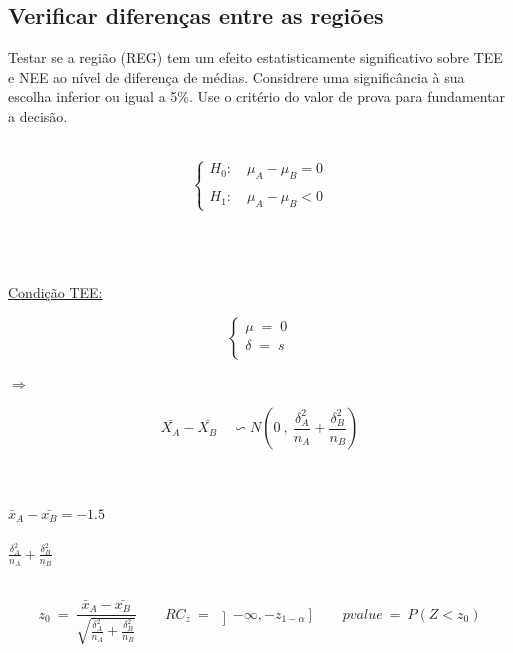 \subsection{Verificar diferenças entre as regiões}
\noindent
Testar se a região (REG) tem um efeito estatisticamente significativo sobre TEE e NEE ao nível de diferença de médias. Considrere uma significância à sua escolha inferior ou igual a 5\%. Use o critério do valor de prova para fundamentar a decisão.\\
\\
\begin{minipage}[l]{0pt}
$$\left\lbrace\begin{array}{l}
H_0: \quad \mu_A-\mu_B=0 \\
\\
H_1: \quad \mu_A-\mu_B<0
\end{array}\right.$$
\end{minipage}
\\
\\
\\
\hspace*{5cm} \underline{Condição TEE:}\\
\begin{minipage}[l]{0pt}
$$\left\lbrace\begin{array}{c}
\mu \;=\; 0 \\
\delta \;=\; s \\
\end{array}\right.$$
\end{minipage}
\hspace{3cm} $\Longrightarrow$ \hspace{1cm}
\begin{minipage}[l]{0pt}
\[\bar{X_A}-\bar{X_B} \quad \backsim N \left( 0\:,\: \frac{\delta_A^2}{n_A}+\frac{\delta_B^2}{n_B} \right) \]
\end{minipage}\\
\\
$\bar{x}_A-\bar{x_B}=-1.5$ \\
\\
$ \frac{\delta_A^2}{n_A}+\frac{\delta_B^2}{n_B} $ \\
\\
\begin{minipage}[l]{0pt}
\[  z_0\:=\: \frac{\bar{x}_A-\bar{x_B}}{\sqrt{\frac{\delta_A^2}{n_A}+\frac{\delta_B^2}{n_B}}} \qquad
	RC_z \:=\: \left] -\infty,-z_{1-\alpha} \right]  \qquad
	pvalue \:=\: P(Z<z_0) \]
\end{minipage}\\
\\
